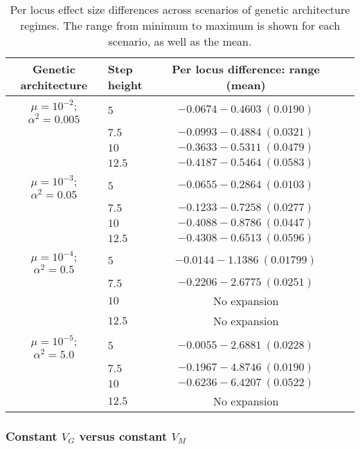 \begin{table}[h]
\centering \footnotesize
\caption[Per locus effect size differences]{Per locus effect size differences across scenarios of genetic architecture regimes. The range from minimum to maximum is shown for each scenario, as well as the mean.}
\label{tab:effects}
\begin{tabular}{cp{}cp{}c}
Genetic architecture				&	Step height	&	Per locus difference: range (mean)  \\ \hline \hline
$\mu = 10^{-2}$; $\alpha^2 = 0.005$	& $5$	& $-0.0674 - 0.4603 ~ (0.0190)$	\\ 
							& $7.5$	& $-0.0993 - 0.4884 ~ (0.0321)$	\\ 
							& $10$	& $-0.3633 - 0.5311 ~ (0.0479)$	\\ 
							& $12.5$	& $-0.4187 - 0.5464 ~ (0.0583)$	\\ \hline
$\mu = 10^{-3}$; $\alpha^2 = 0.05$	& $5$	& $-0.0655 - 0.2864 ~ (0.0103)$	\\ 
							& $7.5$	& $-0.1233 - 0.7258 ~ (0.0277)$	\\ 
							& $10$	& $-0.4088 - 0.8786 ~ (0.0447)$	\\ 
							& $12.5$	& $-0.4308 - 0.6513 ~ (0.0596)$	\\ \hline
$\mu = 10^{-4}$; $\alpha^2 = 0.5$	& $5$	& $-0.0144 - 1.1386 ~ (0.01799)$	\\ 
							& $7.5$	& $-0.2206 - 2.6775 ~ (0.0251)$	\\ 
							& $10$	& No expansion	\\ 
							& $12.5$	& No expansion	\\ \hline
$\mu = 10^{-5}$; $\alpha^2 = 5.0$	& $5$	& ${-0.0055} - 2.6881 ~ (0.0228)$	\\ 
							& $7.5$	& $-0.1967 - 4.8746 ~ (0.0190)$	\\ 
							& $10$	& $-0.6236 - 6.4207 ~ (0.0522)$	\\ 
							& $12.5$	& No expansion	\\ \hline
\end{tabular}
\end{table}

\subsubsection{Constant $V_G$ versus constant $V_M$}

